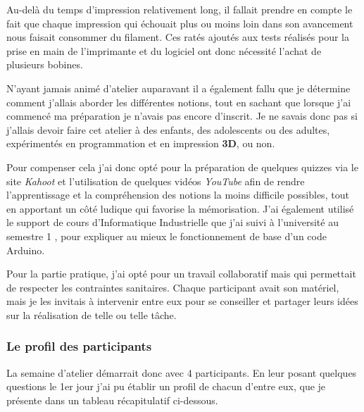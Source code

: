 \vspace{0.5cm}
Au-delà du temps d'impression relativement long, il fallait prendre en compte le fait que chaque impression qui échouait plus ou moins loin dans son avancement nous faisait consommer du filament. Ces ratés ajoutés aux tests réalisés pour la prise en main de l'imprimante et du logiciel ont donc nécessité l'achat de plusieurs bobines.

\vspace{0.5cm}
N'ayant jamais animé d'atelier auparavant il a également fallu que je détermine comment j'allais aborder les différentes notions, tout en sachant que lorsque j'ai commencé ma préparation je n'avais pas encore d'inscrit. Je ne savais donc pas si j'allais devoir faire cet atelier à des enfants, des adolescents ou des adultes, expérimentés en programmation et en impression \textbf{3D}, ou non.

\vspace{0.5cm}
Pour compenser cela j'ai donc opté pour la préparation de quelques quizzes via le site \textit{Kahoot} et l'utilisation de quelques vidéos \textit{YouTube} afin de rendre l'apprentissage et la compréhension des notions la moins difficile possibles, tout en apportant un côté ludique qui favorise la mémorisation. J'ai également utilisé le support de cours d'Informatique Industrielle que j'ai suivi à l'université au semestre 1 \cite{cadiou_langage_nodate}, pour expliquer au mieux le fonctionnement de base d'un code Arduino.

\vspace{0.5cm}
Pour la partie pratique, j'ai opté pour un travail collaboratif mais qui permettait de respecter les contraintes sanitaires. Chaque participant avait son matériel, mais je les invitais à intervenir entre eux pour se conseiller et partager leurs idées sur la réalisation de telle ou telle tâche.

\newpage

\subsubsection{Le profil des participants}

La semaine d'atelier démarrait donc avec 4 participants. En leur posant quelques questions le 1er jour j'ai pu établir un profil de chacun d'entre eux, que je présente dans un tableau récapitulatif ci-dessous.

